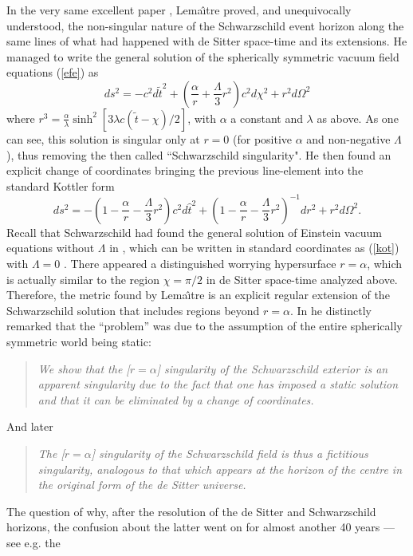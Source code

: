 \documentclass[12pt]{iopart}
\def\be{\begin{equation}}
\def\ee{\end{equation}}
\begin{document}
In the very same excellent paper \cite{L}, Lema\^{\i}tre  proved, and unequivocally
understood, the non-singular nature of the Schwarzschild event horizon along the same lines of what had happened with de Sitter space-time and its extensions. He managed to write the general solution of the spherically symmetric vacuum field equations (\ref{efe}) as
$$
ds^2 =-c^2d\tilde{t}^2 +\left(\frac{\alpha}{r}+\frac{\Lambda}{3}r^2\right) c^2 d\chi^2 +r^2 d\Omega^2
$$
where $r^3=\frac{\alpha}{\lambda} \sinh^2[3\lambda c (\tilde{t}-\chi)/2]$, with $\alpha$ a constant and $\lambda$ as above. As one can see, this solution is singular only at $r=0$ (for positive $\alpha$ and non-negative $\Lambda$), thus removing the then called ``Schwarzschild singularity". He then found an explicit change of coordinates bringing the previous line-element into the standard Kottler form \cite{Kot} 
\be
ds^2 = -\left(1-\frac{\alpha}{r}-\frac{\Lambda}{3} r^2\right)c^2 d\hat t^2
+\left(1-\frac{\alpha}{r}-\frac{\Lambda}{3} r^2\right)^{-1}dr^2 +r^2 d\Omega^2 . \label{kot}
\ee
Recall that Schwarzschild had found the general solution of Einstein vacuum equations without $\Lambda$ in \cite{Sch}, which can be written in standard coordinates as (\ref{kot}) with $\Lambda =0$ \cite{Sch,Droste}. There appeared a distinguished worrying hypersurface $r=\alpha$, which is actually similar to the region $\chi =\pi/2$ in de Sitter space-time analyzed above. Therefore, the metric found by Lema\^{\i}tre is an explicit regular extension of the Schwarzschild solution that includes regions beyond $r=\alpha$. In \cite{L} he
distinctly remarked that the ``problem'' was due to the assumption
of the entire spherically symmetric world being static: 
\begin{quotation}
{\em We show that the [$r = \alpha$] singularity of the Schwarzschild exterior is an
apparent singularity due to the fact that one has imposed a static solution and
that it can be eliminated by a change of coordinates.}
\end{quotation}
And later
\begin{quotation}
{\em The [$r = \alpha$] singularity of the Schwarzschild field is thus a fictitious
singularity, analogous to that which appears at the horizon of the centre in the
original form of the de Sitter universe.}
\end{quotation}
The question of why, after the resolution of the de Sitter and Schwarzschild horizons, the confusion about the
latter went on for almost another 40 years ---see e.g. the
\end{document}
